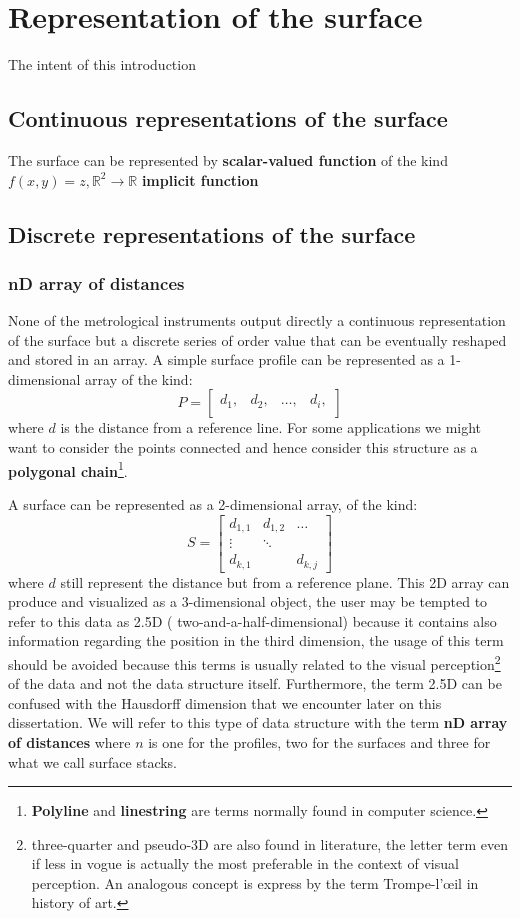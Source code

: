 \section{Representation of the surface}
The intent of this introduction
\subsection{Continuous representations of the surface}
The surface can be represented by \textbf{scalar-valued function} of the kind $ f(x,y) = z, \mathbb{R}^{2} \rightarrow \mathbb{R}$  
\textbf{implicit function} 
\subsection{Discrete representations of the surface}
\subsubsection*{nD array of distances}
None of the metrological instruments output directly a continuous representation of the surface but a discrete series of order value that can be eventually reshaped and stored in an array. A simple surface profile can be represented as a 1-dimensional array of the kind:
$$ P = \begin{bmatrix}
 d_{1},&  d_{2}, & \dots,& d_{i}, \\
\end{bmatrix}
$$
where $d$ is the distance from a reference line. For some applications we might want to consider the points connected and hence consider this structure as a \textbf{polygonal chain}\footnote{\textbf{Polyline} and \textbf{linestring} are terms normally found in computer science.}.\par A surface can be  represented as a 2-dimensional array, of the kind:
$$
S = \begin{bmatrix} 
    d_{1,1} & d_{1,2} & \dots \\
    \vdots & \ddots & \\
    d_{k,1} &        & d_{k,j} 
    \end{bmatrix}
$$
where $d$ still represent the distance but from a reference plane. This 2D array can produce and visualized as a 3-dimensional object, the user may be tempted to refer to this data as 2.5D ( two-and-a-half-dimensional) because it contains also information regarding the position in the third dimension, the usage of this term should be avoided because this terms is usually related to the visual perception\footnote{ three-quarter and pseudo-3D are also found in literature, the letter term even if less in vogue is actually the most preferable in the context of visual perception. An analogous concept is express by the term Trompe-l'œil in history of art.} of the data and not the data structure itself. Furthermore, the term 2.5D can be confused with the Hausdorff dimension that we encounter later on this dissertation.  We will refer to this type of data structure with the term \textbf{nD array of distances} where $n$ is one for the profiles, two for the surfaces and three for what we call surface stacks.
